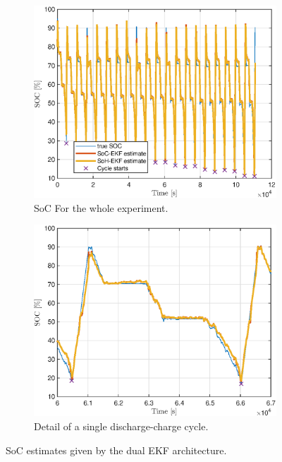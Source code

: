 \begin{figure}[hbp]
    \centering
\begin{subfigure}{0.49\textwidth}
    \centering
    \includegraphics[width=\textwidth]{figures/9/soc-estimate.eps}
    \caption{SoC For the whole experiment.}
    \label{fig:9-soc-estimate}
    \end{subfigure}
    \hfill
    \begin{subfigure}{0.49\textwidth}
    \centering
    \includegraphics[width=\textwidth]{figures/9/soc-estimate-detail.eps}
    \caption{Detail of a single discharge-charge cycle.}
    \label{fig:9-soc-estimate-detail}
    \end{subfigure}
    
    \caption{SoC estimates given by the dual EKF architecture.}
    \label{fig:9-soc}
\end{figure}
 

